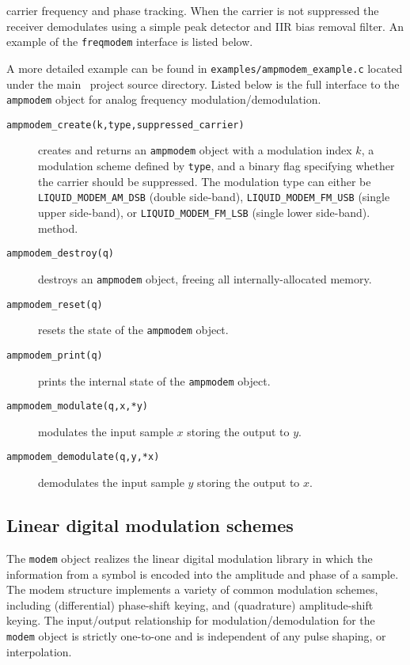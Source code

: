 carrier frequency and phase tracking.
When the carrier is not suppressed the receiver demodulates using a
simple peak detector and IIR bias removal filter.
%
An example of the {\tt freqmodem} interface is listed below.
%

%
A more detailed example can be found in
{\tt examples/ampmodem\_example.c}
located under the main \liquid\ project source directory.
Listed below is the full interface to the {\tt ampmodem} object for
analog frequency modulation/demodulation.
%
\begin{description}
\item[{\tt ampmodem\_create(k,type,suppressed\_carrier)}]
    creates and returns an {\tt ampmodem} object with a modulation
    index $k$,
    a modulation scheme defined by {\tt type},
    and a binary flag specifying whether the carrier should be
    suppressed.
    The modulation type can either be
    {\tt LIQUID\_MODEM\_AM\_DSB} (double side-band),
    {\tt LIQUID\_MODEM\_FM\_USB} (single upper side-band), or
    {\tt LIQUID\_MODEM\_FM\_LSB} (single lower side-band).
    method.
\item[{\tt ampmodem\_destroy(q)}]
    destroys an {\tt ampmodem} object, freeing all internally-allocated
    memory.
\item[{\tt ampmodem\_reset(q)}]
    resets the state of the {\tt ampmodem} object.
\item[{\tt ampmodem\_print(q)}]
    prints the internal state of the {\tt ampmodem} object.
\item[{\tt ampmodem\_modulate(q,x,*y)}]
    modulates the input sample $x$ storing the output to $y$.
\item[{\tt ampmodem\_demodulate(q,y,*x)}]
    demodulates the input sample $y$ storing the output to $x$.
\end{description}





%
%

\subsection{Linear digital modulation schemes}
\label{module:modem:digital}
The {\tt modem} object realizes the linear digital modulation library in which
the information from a symbol is encoded into the amplitude and phase of a
sample.
The modem structure implements a variety of common modulation schemes,
including (differential) phase-shift keying, and (quadrature) amplitude-shift
keying.
The input/output relationship for modulation/demodulation for the {\tt modem}
object is
strictly one-to-one and is independent of any pulse shaping, or interpolation.

